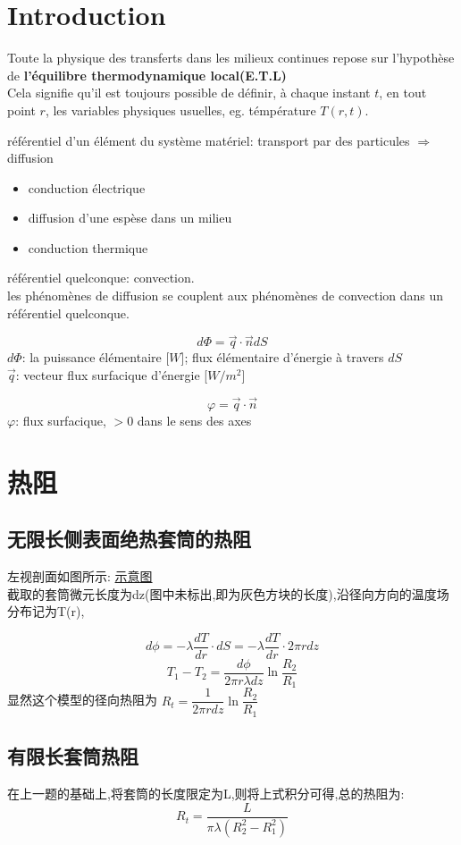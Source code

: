 \documentclass{article}
\begin{document}
\section{Introduction}
Toute la physique des transferts dans les milieux continues repose sur l'hypoth\`ese de \textbf{l'\'equilibre thermodynamique local(E.T.L)}\\
Cela signifie qu'il est toujours possible de d\'efinir, \`a chaque instant $t$, en tout point $r$, les variables physiques usuelles, eg. t\'emp\'erature $T(r,t)$.

\bigskip
r\'ef\'erentiel d'un \'el\'ement du syst\`eme mat\'eriel: transport par des particules $\Rightarrow$ diffusion
\begin{itemize}
\item conduction \'electrique
\item diffusion d'une esp\`ese dans un milieu
\item conduction thermique
\end{itemize}

r\'ef\'erentiel quelconque: convection.\\
les ph\'enom\`enes de diffusion se couplent aux ph\'enom\`enes de convection dans un r\'ef\'erentiel quelconque.

\bigskip
$$ d\Phi = \vec{q} \cdot \vec{n} dS $$
$d\Phi$: la puissance \'el\'ementaire [$W$]; flux \'el\'ementaire d'\'energie \`a travers $dS$\\
$\vec{q}$: vecteur flux surfacique d'\'energie [$W/m^2$]

$$\varphi = \vec{q} \cdot \vec{n}$$
$\varphi$: flux surfacique, $>0$ dans le sens des axes

\section{热阻}
\subsection{无限长侧表面绝热套筒的热阻}
左视剖面如图所示:
\href{http://i.imgbox.com/X9xXlBML.png}{示意图}\\
截取的套筒微元长度为dz(图中未标出,即为灰色方块的长度),沿径向方向的温度场分布记为T(r),

$$
d\phi = -\lambda \dfrac{dT}{dr}\cdot dS = -\lambda \dfrac{dT}{dr} \cdot 2\pi rdz
$$
$$ T_1 - T_2 = \dfrac{d\phi}{2\pi r\lambda dz} \ln{\dfrac{R_2}{R_1}} $$
显然这个模型的径向热阻为 $R_t = \dfrac{1}{2\pi rdz} \ln{\dfrac{R_2}{R_1}}$

\subsection{有限长套筒热阻}
在上一题的基础上,将套筒的长度限定为L,则将上式积分可得,总的热阻为:
$$ R_t = \dfrac{L}{\pi \lambda(R_2^2 - R_1^2)} $$
\end{document}
